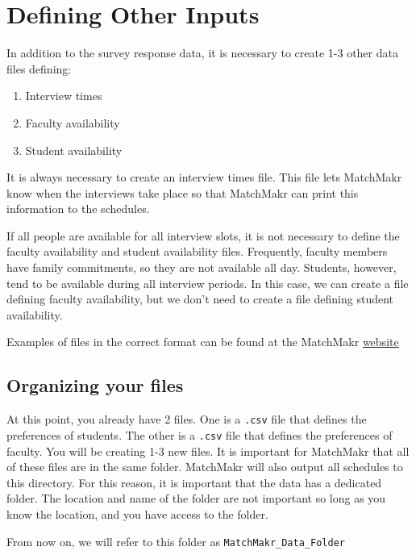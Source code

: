 \chapter{Defining Other Inputs}

In addition to the survey response data, it is necessary to create 1-3 other data files defining:
\begin{enumerate}
	\item Interview times
	\item Faculty availability
	\item Student availability
\end{enumerate}

It is always necessary to create an interview times file.  This file lets MatchMakr know when the interviews take place so that MatchMakr can print this information to the schedules.

If all people are available for all interview slots, it is not necessary to define the faculty availability and student availability files.  Frequently, faculty members have family commitments, so they are not available all day.  Students, however, tend to be available during all interview periods.  In this case, we can create a file defining faculty availability, but we don't need to create a file defining student availability.

Examples of files in the correct format can be found at the MatchMakr \href{https://sites.google.com/case.edu/matchmakr/home}{website}



%
%
\section{Organizing your files}
At this point, you already have 2 files.  One is a \texttt{.csv} file that defines the preferences of students.  The other is a \texttt{.csv} file that defines the preferences of faculty.  You will be creating 1-3 new files.  It is important for MatchMakr that all of these files are in the same folder.  MatchMakr will also output all schedules to this directory.  For this reason, it is important that the data has a dedicated folder.  The location and name of the folder are not important so long as you know the location, and you have access to the folder.

From now on, we will refer to this folder as \texttt{MatchMakr\_Data\_Folder}

